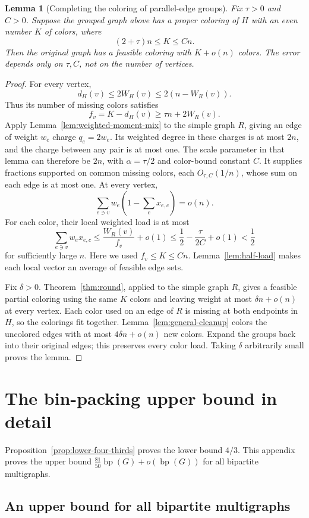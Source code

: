 \documentclass[11pt]{article}
\newtheorem{lemma}[theorem]{Lemma}
\theoremstyle{definition}\newtheorem{algorithm}{Algorithm}[section]
\numberwithin{equation}{section}
\theoremstyle{remark}\newtheorem*{remark}{Remark}
\newcommand{\bp}{\operatorname{bp}}
\begin{document}
\begin{lemma}[Completing the coloring of parallel-edge groups]\label{lem:finish-packets}
Fix $\tau>0$ and $C>0$. Suppose the grouped graph above has a proper
coloring of $H$ with an even number $K$ of colors, where
\[
 (2+\tau)n\le K\le Cn.
\]
Then the original graph has a feasible coloring with $K+o(n)$ colors.
The error depends only on $\tau,C$, not on the number of vertices.
\end{lemma}
\begin{proof}
For every vertex,
\[
 d_H(v)\le2W_H(v)\le2(n-W_R(v)).
\]
Thus its number of missing colors satisfies
\[
 f_v=K-d_H(v)\ge\tau n+2W_R(v).
\]
Apply Lemma~\ref{lem:weighted-moment-mix} to the simple graph $R$, giving
an edge of weight $w_e$ charge $q_e=2w_e$. Its weighted degree in these
charges is at most $2n$, and the charge between any pair is at most one.
The scale parameter in that lemma can therefore be $2n$, with
$\alpha=\tau/2$ and color-bound constant $C$.
It supplies fractions supported on common missing colors, each
$O_{\tau,C}(1/n)$, whose sum on each edge is at most one. At every vertex,
\[
 \sum_{e\ni v}w_e\left(1-\sum_cx_{e,c}\right)=o(n).
\]
For each color, their local weighted load is at most
\[
 \sum_{e\ni v}w_ex_{e,c}
 \le\frac{W_R(v)}{f_v}+o(1)
 \le\frac12-\frac{\tau}{2C}+o(1)<\frac12
\]
for sufficiently large $n$. Here we used $f_v\le K\le Cn$.
Lemma~\ref{lem:half-load} makes each local vector an average of feasible
edge sets.

Fix $\delta>0$. Theorem~\ref{thm:round}, applied to the simple graph
$R$, gives a feasible partial coloring using the same $K$ colors and
leaving weight at most $\delta n+o(n)$ at every vertex. Each color used
on an edge of $R$ is missing at both endpoints in $H$, so the colorings
fit together. Lemma~\ref{lem:general-cleanup} colors the uncolored
edges with at most $4\delta n+o(n)$ new colors. Expand the groups back
into their original edges; this preserves every color load. Taking
$\delta$ arbitrarily small proves the lemma.
\end{proof}

\section{The bin-packing upper bound in detail}\label{sec:bp-details}
Proposition~\ref{prop:lower-four-thirds} proves the lower bound $4/3$.
This appendix proves the upper bound
$\frac{81}{50}\bp(G)+o(\bp(G))$ for all bipartite multigraphs.

\subsection{An upper bound for all bipartite multigraphs}
\label{sec:bp-unrestricted}
\end{document}
